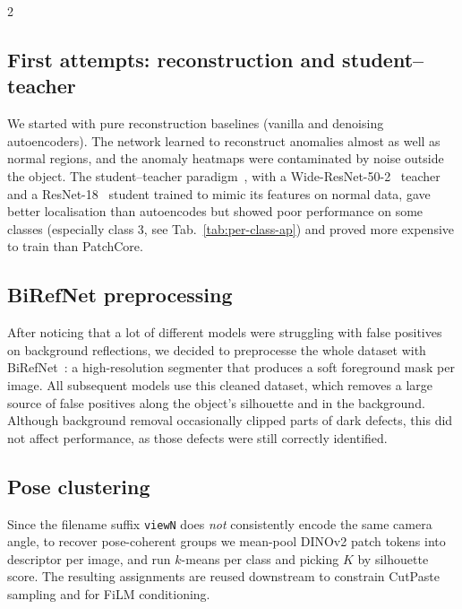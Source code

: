 \documentclass[11pt]{article}
\begin{document}
\begin{multicols}{2}
        \subsection{First attempts: reconstruction and student--teacher}
        We started with pure reconstruction baselines (vanilla and denoising
        autoencoders). The network learned to reconstruct anomalies
        almost as well as normal regions, and the anomaly heatmaps were contaminated
        by noise outside the object. The student--teacher
        paradigm~\cite{bergmann2020uninformed}, with a Wide-ResNet-50-2~\cite{Zagoruyko2016WRN} teacher
        and a ResNet-18~\cite{He2015Deep} student trained to mimic its features on normal data,
        gave better localisation than autoencodes but showed poor performance on some classes (especially class 3, see Tab.~\ref{tab:per-class-ap}) and proved more expensive to train than PatchCore.

        \subsection{BiRefNet preprocessing}
        After noticing that a lot of different models were struggling with false positives on background reflections, we decided to
        preprocesse the whole dataset with
        BiRefNet~\cite{zheng2024birefnet}: a high-resolution
        segmenter that produces
        a soft foreground mask per image. All
        subsequent models use this cleaned dataset, which removes a large
        source of false positives along the object's silhouette and in the background. Although background removal occasionally clipped parts of dark defects, this did not affect performance, as those defects were still correctly identified.


        \subsection{Pose clustering}
        Since the filename suffix \texttt{viewN} does \emph{not} consistently encode
        the same camera angle, to recover
        pose-coherent groups we mean-pool DINOv2 patch tokens into
        descriptor per image, and run $k$-means per class
        and picking $K$ by silhouette score. The
        resulting assignments are reused
        downstream to constrain CutPaste sampling and for FiLM conditioning.


\end{multicols}
\end{document}
